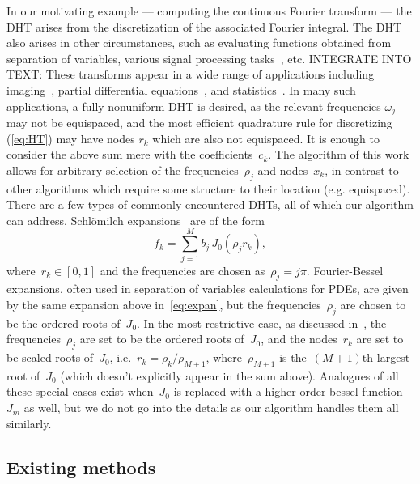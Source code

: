 In our motivating example --- computing the continuous Fourier transform --- the
DHT arises from the discretization of the associated Fourier integral. The DHT
also arises in other circumstances, such as evaluating functions obtained from
separation of variables, various signal processing tasks~\cite{},
etc.{\color{red} INTEGRATE INTO TEXT: These transforms appear in a wide range of
applications including imaging~\cite{higgins1988hankel, zhao2013fourier},
partial differential equations~\cite{bisseling1985fast,ali1999generalized}, and
statistics~\cite{lord1954a, genton2002nonparametric}. In many such applications,
a fully nonuniform DHT is desired, as the relevant frequencies $\omega_j$ may
not be equispaced, and the most efficient quadrature rule for discretizing
(\ref{eq:HT}) may have nodes $r_k$ which are also not equispaced. } It is enough
to consider the above sum mere with the coefficients~$c_k$. The algorithm of
this work allows for arbitrary selection of the frequencies~$\rho_j$ and
nodes~$x_k$, in contrast to other algorithms which require some structure to
their location (e.g. equispaced). There are a few types of commonly encountered
DHTs, all of which our algorithm can address. Schl\"omilch expansions~\cite{}
are of the form
\begin{equation}
  \label{eq:expan}
  f_k = \sum_{j = 1}^M b_j \, J_0(\rho_j r_k),
\end{equation}
where~$r_k \in [0,1]$ and the frequencies are chosen as~$\rho_j = j\pi$.
Fourier-Bessel expansions, often used in separation of variables calculations
for PDEs, are given by the same expansion above in~\eqref{eq:expan}, but the
frequencies~$\rho_j$ are chosen to be the ordered roots of~$J_0$. In the most
restrictive case, as discussed in~\cite{johnson1987}, the frequencies~$\rho_j$
are set to be the ordered roots of~$J_0$, and the nodes~$r_k$ are set to be
scaled roots of~$J_0$, i.e.~$r_k = \rho_k/\rho_{M+1}$, where~$\rho_{M+1}$ is
the~$(M+1)$th largest root of~$J_0$ (which doesn't explicitly appear in the sum
above). Analogues of all these special cases exist when~$J_0$ is replaced with a
higher order bessel function~$J_m$ as well, but we do not go into the details as
our algorithm handles them all similarly.




\subsection*{Existing methods}
\label{sec:existing}

